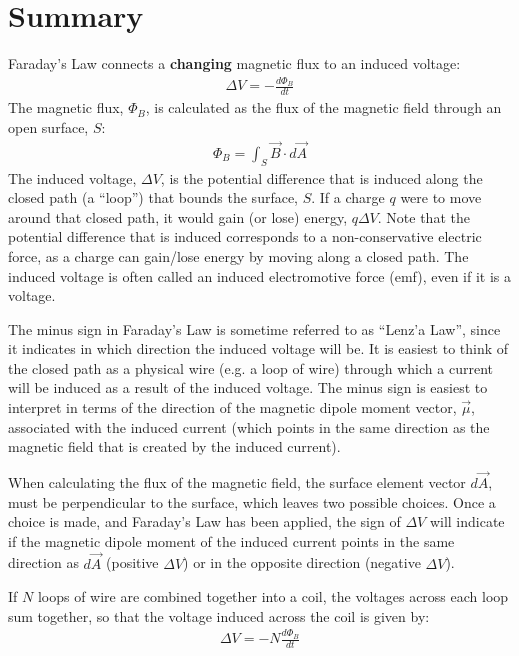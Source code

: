 \newpage
\section{Summary}

\begin{chapterSummary}
Faraday's Law connects a \textbf{changing} magnetic flux to an induced voltage:
\begin{align*}
\Delta V = -\frac{d\Phi_B}{dt}
\end{align*}
The magnetic flux, $\Phi_B$, is calculated as the flux of the magnetic field through an open surface, $S$:
\begin{align*}
\Phi_B = \int_S \vec B\cdot d\vec A
\end{align*}
The induced voltage, $\Delta V$, is the potential difference that is induced along the closed path (a ``loop'') that bounds the surface, $S$. If a charge $q$ were to move around that closed path, it would gain (or lose) energy, $q\Delta V$. Note that the potential difference that is induced corresponds to a non-conservative electric force, as a charge can gain/lose energy by moving along a closed path. The induced voltage is often called an induced electromotive force (emf), even if it is a voltage.

The minus sign in Faraday's Law is sometime referred to as ``Lenz'a Law'', since it indicates in which direction the induced voltage will be. It is easiest to think of the closed path as a physical wire (e.g. a loop of wire) through which a current will be induced as a result of the induced voltage. The minus sign is easiest to interpret in terms of the direction of the magnetic dipole moment vector, $\vec \mu$, associated with the induced current (which points in the same direction as the magnetic field that is created by the induced current). 

When calculating the flux of the magnetic field, the surface element vector $d\vec A$, must be perpendicular to the surface, which leaves two possible choices. Once a choice is made, and Faraday's Law has been applied, the sign of $\Delta V$ will indicate if the magnetic dipole moment of the induced current points in the same direction as $d\vec A$ (positive $\Delta V$) or in the opposite direction (negative $\Delta V$).

If $N$ loops of wire are combined together into a coil, the voltages across each loop sum together, so that the voltage induced across the coil is given by:
\begin{align*}
\Delta V = -N\frac{d\Phi_B}{dt}
\end{align*}


\end{chapterSummary}
